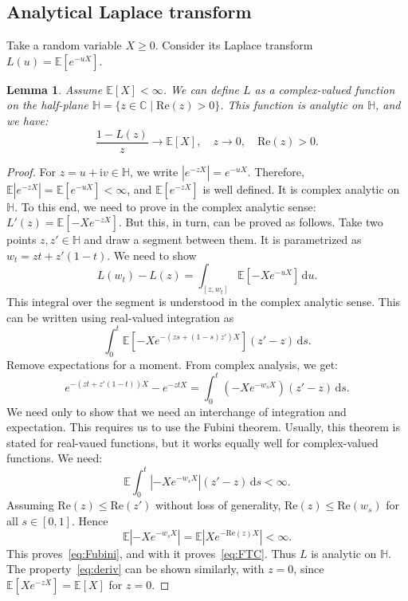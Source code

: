 \documentclass[12pt]{amsart}
\newtheorem{lemma}{Lemma}[section]
\theoremstyle{remark}
\theoremstyle{definition}
\begin{document}
\subsection{Analytical Laplace transform} Take a random variable $X \ge 0$. Consider its Laplace transform $L(u) = \mathbb E[e^{-uX}]$.

\begin{lemma} Assume $\mathbb E[X] < \infty$. We can define $L$ as a complex-valued function on the half-plane $\mathbb H = \{z \in \mathbb C\mid \mathrm{Re}(z) > 0\}$. This function is analytic on $\mathbb H$, and we have: 
\begin{equation}
\label{eq:deriv}
\frac{1 - L(z)}{z} \to \mathbb E[X],\quad z \to 0,\quad \mathrm{Re}(z) > 0.
\end{equation}
\label{lemma:tech}
\end{lemma}

\begin{proof} For $z = u + \mathrm{i}v \in \mathbb H$, we write $|e^{-zX}| = e^{-uX}$. Therefore, $\mathbb E|e^{-zX}| = \mathbb E[e^{-uX}] < \infty$, and $\mathbb E[e^{-zX}]$ is well defined. It is complex analytic on $\mathbb H$. To this end, we need to prove in the complex analytic sense: $L'(z) = \mathbb E[-Xe^{-zX}]$. But this, in turn, can be proved as follows. Take two points $z, z' \in \mathbb H$ and draw a segment between them. It is parametrized as $w_t = zt + z'(1-t)$. We need to show 
\begin{equation}
\label{eq:FTC}
L(w_t) - L(z) = \int_{[z, w_t]}\mathbb E\left[-Xe^{-uX}\right]\,\mathrm{d}u.
\end{equation}
This integral over the segment is understood in the complex analytic sense. This can be written using real-valued integration as
$$
\int_0^t\mathbb E\left[-Xe^{-(zs + (1-s)z')X}\right](z' - z)\,\mathrm{d}s.
$$
Remove expectations for a moment. From complex analysis, we get:
$$
e^{-(zt + z'(1-t))X} - e^{-ztX} = \int_0^t\left(-Xe^{-w_sX}\right)(z' - z)\,\mathrm{d}s.
$$
We need only to show that we need an interchange of integration and expectation. This requires us to use the Fubini theorem. Usually, this theorem is stated for real-vaued functions, but it works equally well for complex-valued functions. We need:
\begin{equation}
\label{eq:Fubini}
\mathbb E\int_0^t\left|-Xe^{-w_sX}\right|(z'-z)\,\mathrm{d}s < \infty.
\end{equation}
Assuming $\mathrm{Re}(z) \le \mathrm{Re}(z')$ without loss of generality, 
$\mathrm{Re}(z) \le \mathrm{Re}(w_s)$ for all $s \in [0, 1]$. Hence
$$
\mathbb E|-Xe^{-w_sX}| = \mathbb E|Xe^{-\mathrm{Re}(z)X}| < \infty.
$$
This proves~\eqref{eq:Fubini}, and with it proves~\eqref{eq:FTC}. Thus $L$ is analytic on $\mathbb H$. The property~\eqref{eq:deriv} can be shown similarly, with $z = 0$, since $\mathbb E[Xe^{-zX}] = \mathbb E[X]$ for $z = 0$. 
\end{proof}
\end{document}
